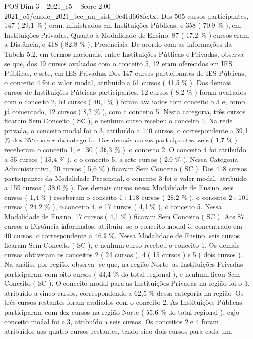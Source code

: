 \begin{textsample}{POS Dim 3 – 2021\_c5 – Score 2.00 – 2021\_c5/enade\_2021\_tec\_an\_sist\_0e41d668fe.txt}
Dos 505 cursos participantes, 147 ( 29,1 \% ) eram ministrados em Instituições Públicas, e 358 ( 70,9 \% ), em Instituições Privadas.
Quanto à Modalidade de Ensino, 87 ( 17,2 \% ) cursos eram a Distância, e 418 ( 82,8 \% ), Presenciais.
De acordo com as informações da Tabela 5.2, em termos nacionais, entre Instituições Públicas e Privadas, observa -se que, dos 19 cursos avaliados com o conceito 5, 12 eram oferecidos em IES Públicas, e sete, em IES Privadas.
Dos 147 cursos participantes de IES Públicas, o conceito 4 foi o valor modal, atribuído a 61 cursos ( 41,5 \% ).
Dos demais cursos de Instituições Públicas participantes, 12 cursos ( 8,2 \% ) foram avaliados com o conceito 2, 59 cursos ( 40,1 \% ) foram avaliados com conceito o 3 e, como já comentado, 12 cursos ( 8,2 \% ), com o conceito 5.
Nesta categoria, três cursos ficaram Sem Conceito ( SC ), e nenhum curso recebeu o conceito 1.
Na rede privada, o conceito modal foi o 3, atribuído a 140 cursos, o correspondente a 39,1 \% dos 358 cursos da categoria.
Dos demais cursos participantes, seis ( 1,7 \% ) receberam o conceito 1, e 130 ( 36,3 \% ), o conceito 2.
O conceito 4 foi atribuído a 55 cursos ( 15,4 \% ), e o conceito 5, a sete cursos ( 2,0 \% ).
Nessa Categoria Administrativa, 20 cursos ( 5,6 \% ) ficaram Sem Conceito ( SC ).
Dos 418 cursos participantes da Modalidade Presencial, o conceito 3 foi o valor modal, atribuído a 159 cursos ( 38,0 \% ).
Dos demais cursos nessa Modalidade de Ensino, seis cursos ( 1,4 \% ) receberam o conceito 1 ; 118 cursos ( 28,2 \% ), o conceito 2 ; 101 cursos ( 24,2 \% ), o conceito 4, e 17 cursos ( 4,1 \% ), o conceito 5.
Nessa Modalidade de Ensino, 17 cursos ( 4,1 \% ) ficaram Sem Conceito ( SC ).
Aos 87 cursos a Distância informados, atribuiu -se o conceito modal 3, concentrado em 40 cursos, o correspondente a 46,0 \%.
Nessa Modalidade de Ensino, seis cursos ficaram Sem Conceito ( SC ), e nenhum curso recebeu o conceito 1.
Os demais cursos obtiveram os conceitos 2 ( 24 cursos ), 4 ( 15 cursos ) e 5 ( dois cursos ).
Na análise por região, observa -se que, na região Norte, as Instituições Privadas participaram com oito cursos ( 44,4 \% do total regional ), e nenhum ficou Sem Conceito ( SC ).
O conceito modal para as Instituições Privadas na região foi o 3, atribuído a cinco cursos, correspondendo a 62,5 \% dessa categoria na região.
Os três cursos restantes foram avaliados com o conceito 2.
As Instituições Públicas participaram com dez cursos na região Norte ( 55,6 \% do total regional ), cujo conceito modal foi o 3, atribuído a seis cursos.
Os conceitos 2 e 4 foram atribuídos aos quatro cursos restantes, tendo sido dois cursos para cada um.

\end{textsample}
